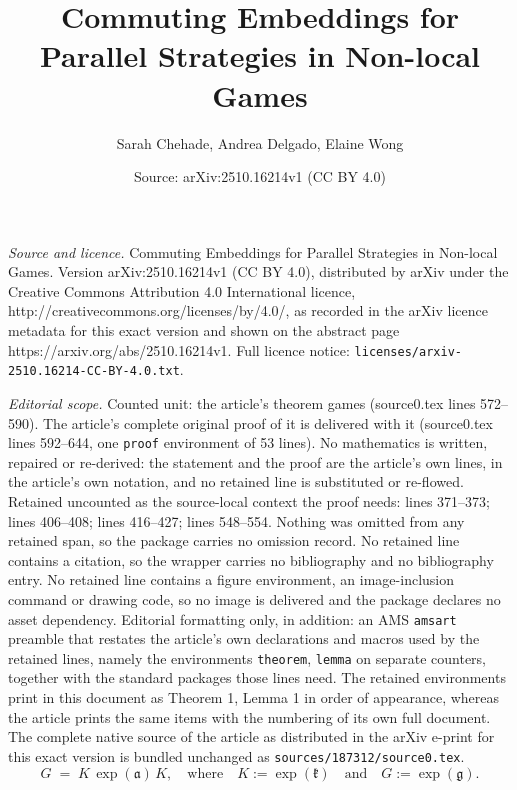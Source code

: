 \documentclass[10pt,a4paper]{amsart}
\title{Commuting Embeddings for Parallel Strategies in Non-local Games}
\author{Sarah Chehade, Andrea Delgado, Elaine Wong}
\date{Source: arXiv:2510.16214v1 (CC BY 4.0)}
\begin{document}
\maketitle

\noindent\emph{Source and licence.} Commuting Embeddings for Parallel Strategies in Non-local Games. Version arXiv:2510.16214v1 (CC BY 4.0), distributed by arXiv under the Creative Commons Attribution 4.0 International licence, http://creativecommons.org/licenses/by/4.0/, as recorded in the arXiv licence metadata for this exact version and shown on the abstract page https://arxiv.org/abs/2510.16214v1. Full licence notice: \texttt{licenses/arxiv-2510.16214-CC-BY-4.0.txt}.\par\smallskip

\noindent\textit{Editorial scope.} Counted unit: the article's theorem games (source0.tex lines 572--590). The article's complete original proof of it is delivered with it (source0.tex lines 592--644, one \texttt{proof} environment of 53 lines). No mathematics is written, repaired or re-derived: the statement and the proof are the article's own lines, in the article's own notation, and no retained line is substituted or re-flowed.  Retained uncounted as the source-local context the proof needs: lines 371--373; lines 406--408; lines 416--427; lines 548--554.  Nothing was omitted from any retained span, so the package carries no omission record.  No retained line contains a citation, so the wrapper carries no bibliography and no bibliography entry.  No retained line contains a figure environment, an image-inclusion command or drawing code, so no image is delivered and the package declares no asset dependency.  Editorial formatting only, in addition: an AMS \texttt{amsart} preamble that restates the article's own declarations and macros used by the retained lines, namely the environments \texttt{theorem}, \texttt{lemma} on separate counters, together with the standard packages those lines need.  The retained environments print in this document as Theorem 1, Lemma 1 in order of appearance, whereas the article prints the same items with the numbering of its own full document.  The complete native source of the article as distributed in the arXiv e-print for this exact version is bundled unchanged as \texttt{sources/187312/source0.tex}.
    \begin{equation}\label{eq:KAK}
        G\;=\;K\,\exp(\mathfrak{a})\,K, \quad\text{where}\quad K:=\exp(\mathfrak{k}) \quad\text{and}\quad G:=\exp(\mathfrak{g}).
    \end{equation}
\end{document}

